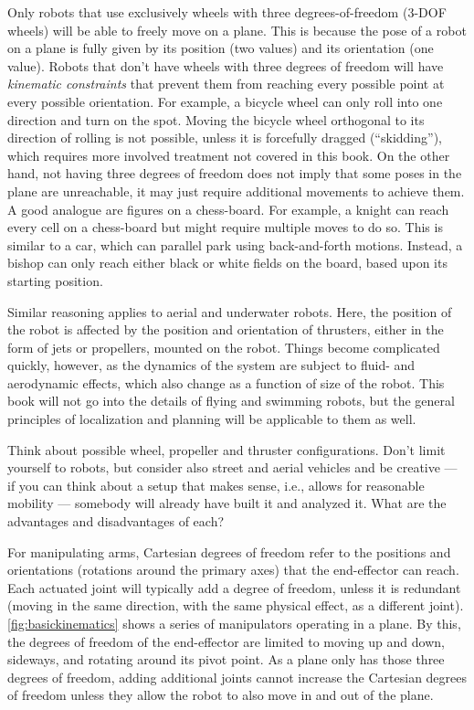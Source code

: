 Only robots that use exclusively wheels with three degrees-of-freedom (3-DOF wheels) will be able to freely move on a plane. This is because the pose of a robot on a plane is fully given by its position (two values) and its orientation (one value). Robots that don't have wheels with three degrees of freedom will have \emph{kinematic constraints} that prevent them from reaching every possible point at every possible orientation. For example, a bicycle wheel can only roll into one direction and turn on the spot. Moving the bicycle wheel orthogonal to its direction of rolling is not possible, unless it is forcefully dragged (``skidding''), which requires more involved treatment not covered in this book. On the other hand, not having three degrees of freedom does not imply that some poses in the plane are unreachable, it may just require additional movements to achieve them.
A good analogue are figures on a chess-board. For example, a knight can reach every cell on a chess-board but might require multiple moves to do so. This is similar to a car, which can parallel park using back-and-forth motions. Instead, a bishop can only reach either black or white fields on the board, based upon its starting position.

Similar reasoning applies to aerial and underwater robots. Here, the position of the robot is affected by the position and orientation of thrusters, either in the form of jets or propellers, mounted on the robot. Things become complicated quickly, however, as the dynamics of the system are subject to fluid- and aerodynamic effects, which also change as a function of size of the robot. This book will not go into the details of flying and swimming robots, but the general principles of localization and planning will be applicable to them as well.

\begin{mdframed}Think about possible wheel, propeller and thruster configurations. Don't limit yourself to robots, but consider also street and aerial vehicles and be creative --- if you can think about a setup that makes sense, i.e., allows for reasonable mobility --- somebody will already have built it and analyzed it. What are the advantages and disadvantages of each?
\end{mdframed}

For manipulating arms, Cartesian degrees of freedom refer to the positions and orientations (rotations around the primary axes) that the end-effector can reach. Each actuated joint will typically add a degree of freedom, unless it is redundant (moving in the same direction, with the same physical effect, as a different joint). \cref{fig:basickinematics} shows a series of manipulators operating in a plane. By this, the degrees of freedom of the end-effector are limited to moving up and down, sideways, and rotating around its pivot point. As a plane only has those three degrees of freedom, adding additional joints cannot increase the Cartesian degrees of freedom unless they allow the robot to also move in and out of the plane.


